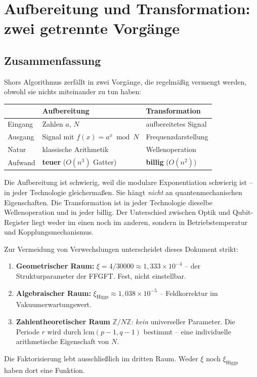 
\section{Aufbereitung und Transformation: zwei getrennte Vorgänge}

\subsection*{Zusammenfassung}

Shors Algorithmus zerfällt in zwei Vorgänge, die regelmäßig vermengt
werden, obwohl sie nichts miteinander zu tun haben:

\begin{center}
\begin{tabular}{lll}
\toprule
 & \textbf{Aufbereitung} & \textbf{Transformation} \\
\midrule
Eingang & Zahlen $a$, $N$ & aufbereitetes Signal \\
Ausgang & Signal mit $f(x) = a^x \bmod N$ & Frequenzdarstellung \\
Natur & klassische Arithmetik & Wellenoperation \\
Aufwand & \textbf{teuer} ($O(n^3)$ Gatter) & \textbf{billig} ($O(n^2)$) \\
\bottomrule
\end{tabular}
\end{center}

Die Aufbereitung ist schwierig, weil die modulare Exponentiation
schwierig ist -- in jeder Technologie gleichermaßen. Sie hängt
\emph{nicht} an quantenmechanischen Eigenschaften. Die Transformation
ist in jeder Technologie dieselbe Wellenoperation und in jeder billig.
Der Unterschied zwischen Optik und Qubit-Register liegt weder im einen
noch im anderen, sondern in Betriebstemperatur und
Kopplungsmechanismus.


\begin{keyresult}
Zur Vermeidung von Verwechslungen unterscheidet dieses Dokument strikt:
\begin{enumerate}
  \item \textbf{Geometrischer Raum:} $\xi = 4/30000 \approx 1{,}333\times10^{-4}$
    -- der Strukturparameter der FFGFT. Fest, nicht einstellbar.
  \item \textbf{Algebraischer Raum:} $\xi_{\text{Higgs}} \approx
    1{,}038\times10^{-5}$ -- Feldkorrektur im Vakuumerwartungswert.
  \item \textbf{Zahlentheoretischer Raum} $\mathbb{Z}/N\mathbb{Z}$:
    \emph{kein} universeller Parameter. Die Periode $r$ wird durch
    $\mathrm{lcm}(p-1,q-1)$ bestimmt -- eine individuelle arithmetische
    Eigenschaft von $N$.
\end{enumerate}
Die Faktorisierung lebt ausschließlich im dritten Raum. Weder $\xi$ noch
$\xi_{\text{Higgs}}$ haben dort eine Funktion.
\end{keyresult}

